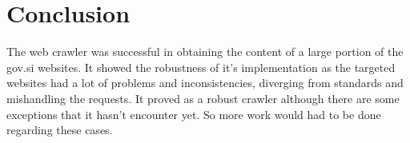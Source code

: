 \documentclass[9pt]{IEEEtran}
\begin{document}
\section{Conclusion}

The web crawler was successful in obtaining the content of a large portion of the gov.si websites.
It showed the robustness of it's implementation as the targeted websites had a lot of problems and inconsistencies, diverging from standards and mishandling the requests.
It proved as a robust crawler although there are some exceptions that it hasn't encounter yet.
So more work would had to be done regarding these cases.



\end{document}

